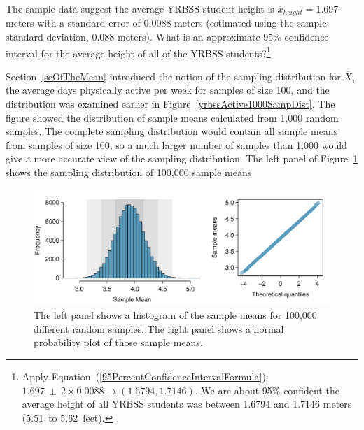 \begin{spacing}{1.5}
\begin{exercise} \label{95CIExerciseForAgeOfYrbssSamp1}
The sample data suggest the average YRBSS student height is $\overline{x}_{height} = 1.697$ meters with a standard error of 0.0088 meters (estimated using the sample standard deviation, 0.088 meters). What is an approximate 95\% confidence interval for the average height of all of the YRBSS students?\footnote{Apply Equation~(\ref{95PercentConfidenceIntervalFormula}): $1.697 \ \pm \ 2\times 0.0088 \rightarrow (1.6794, 1.7146)$.  We are about 95\% confident the average height of all YRBSS students was between 1.6794 and 1.7146 meters (5.51~to 5.62~feet).}
\end{exercise}


Section~\ref{seOfTheMean} introduced the notion of the sampling distribution for $\overline{X}$, the average days physically active per week for samples of size 100, and the distribution was examined earlier in Figure~\ref{yrbssActive1000SampDist}. The figure showed the distribution of sample means calculated from 1,000 random samples. The complete sampling distribution would contain all sample means from samples of size 100, so a much larger number of samples than 1,000 would give a more accurate view  of the sampling distribution.  The left panel of Figure~\ref{yrbssActiveBigSampDist} shows the sampling distribution of 100,000 sample means


\begin{figure}[hht]
   \centering
   \includegraphics[width=\textwidth]
{ch_inference_foundations_oi_biostat/figures/yrbssActiveBigSampDist/yrbssActiveBigSampDist}
   \caption{The left panel shows a histogram of the sample means for 100,000 different random samples. The right panel shows a normal probability plot of those sample means.}
   \label{yrbssActiveBigSampDist}
\end{figure}


\end{spacing}
